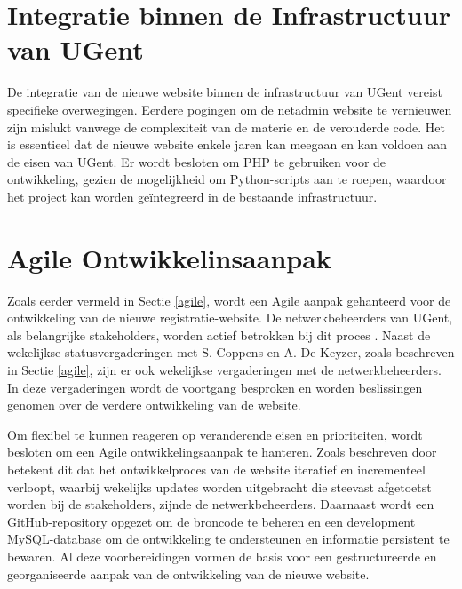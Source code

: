 \section{Integratie binnen de Infrastructuur van UGent}
De integratie van de nieuwe website binnen de infrastructuur van UGent vereist specifieke overwegingen. Eerdere pogingen om de netadmin website te vernieuwen zijn mislukt vanwege de complexiteit van de materie en de verouderde code. Het is essentieel dat de nieuwe website enkele jaren kan meegaan en kan voldoen aan de eisen van UGent. Er wordt besloten om PHP te gebruiken voor de ontwikkeling, gezien de mogelijkheid om Python-scripts aan te roepen, waardoor het project kan worden geïntegreerd in de bestaande infrastructuur.

\section{Agile Ontwikkelinsaanpak}
Zoals eerder vermeld in Sectie \ref{agile}, wordt een Agile aanpak gehanteerd voor de ontwikkeling van de nieuwe registratie-website. De netwerkbeheerders van UGent, als belangrijke stakeholders, worden actief betrokken bij dit proces \autocite{Salameh2014}. Naast de wekelijkse statusvergaderingen met S. Coppens en A. De Keyzer, zoals beschreven in Sectie \ref{agile}, zijn er ook wekelijkse vergaderingen met de netwerkbeheerders. In deze vergaderingen wordt de voortgang besproken en worden beslissingen genomen over de verdere ontwikkeling van de website.

Om flexibel te kunnen reageren op veranderende eisen en prioriteiten, wordt besloten om een Agile ontwikkelingsaanpak te hanteren.
Zoals beschreven door \textcite{Salameh2014} betekent dit dat het ontwikkelproces van de website iteratief en incrementeel verloopt, waarbij wekelijks updates worden uitgebracht die steevast afgetoetst worden bij de stakeholders, zijnde de netwerkbeheerders.
Daarnaast wordt een GitHub-repository opgezet om de broncode te beheren en een development MySQL-database om de ontwikkeling te ondersteunen en informatie persistent te bewaren.
Al deze voorbereidingen vormen de basis voor een gestructureerde en georganiseerde aanpak van de ontwikkeling van de nieuwe website.
